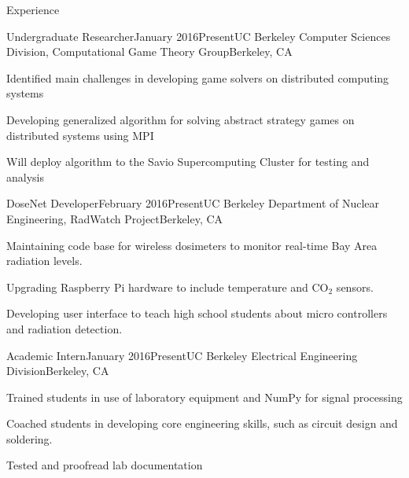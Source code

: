 \documentclass{resume} %
\begin{document}
\begin{rSection}{Experience}
\begin{rSubsection}{Undergraduate Researcher}{January 2016\textminus Present}{UC Berkeley Computer Sciences Division, Computational Game Theory Group}{Berkeley, CA}
\item[] Identified main challenges in developing game solvers on distributed computing systems
\item[] Developing generalized algorithm for solving abstract strategy games on distributed systems using MPI
\item[] Will deploy algorithm to the Savio Supercomputing Cluster for testing and analysis
\end{rSubsection}
\begin{rSubsection}{DoseNet Developer}{February 2016\textminus Present}{UC Berkeley Department of Nuclear Engineering, RadWatch Project}{Berkeley, CA}
\item[] Maintaining code base for wireless dosimeters to monitor real-time Bay Area radiation levels.
\item[] Upgrading Raspberry Pi hardware to include temperature and CO$_2$ sensors. 
\item[] Developing user interface to teach high school students about micro controllers and radiation detection.
\end{rSubsection}
\begin{rSubsection}{Academic Intern}{January 2016\textminus Present}{UC Berkeley Electrical Engineering Division}{Berkeley, CA}
\item[] Trained students in use of laboratory equipment and NumPy for signal processing
\item[] Coached students in developing core engineering skills, such as circuit design and soldering.
\item[] Tested and proofread lab documentation
\end{rSubsection}
\end{rSection}

\end{document}
